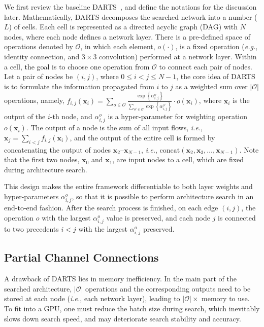 \documentclass{article} \usepackage{iclr2020_conference,times}
\begin{document}
We first review the baseline DARTS~\citep{liu2018darts}, and define the notations for the discussion later. Mathematically, DARTS decomposes the searched network into a number ($L$) of cells. Each cell is represented as a directed acyclic graph (DAG) with $N$ nodes, where each node defines a network layer. There is a pre-defined space of operations denoted by $\mathcal{O}$, in which each element, $o\!\left(\cdot\right)$, is a fixed operation (\textit{e.g.}, identity connection, and $3\times3$ convolution) performed at a network layer. Within a cell, the goal is to choose one operation from $\mathcal{O}$ to connect each pair of nodes. Let a pair of nodes be $\left(i,j\right)$, where ${0}\leqslant{i}<{j}\leqslant{N-1}$, the core idea of DARTS is to formulate the information propagated from $i$ to $j$ as a weighted sum over $\left|\mathcal{O}\right|$ operations, namely, ${f_{i,j}\!\left(\mathbf{x}_i\right)}={{\sum_{o\in\mathcal{O}}}\frac{\exp\left\{\alpha_{i,j}^o\right\}}{{\sum_{o'\in\mathcal{O}}}\exp\left\{\alpha_{i,j}^{o'}\right\}}\cdot o\!\left(\mathbf{x}_i\right)}$, where $\mathbf{x}_i$ is the output of the $i$-th node, and $\alpha_{i,j}^o$ is a hyper-parameter for weighting operation $o\!\left(\mathbf{x}_i\right)$. The output of a node is the sum of all input flows, \textit{i.e.}, ${\mathbf{x}_j}={{\sum_{i<j}}f_{i,j}\!\left(\mathbf{x}_i\right)}$, and the output of the entire cell is formed by concatenating the output of nodes $\mathbf{x}_2$--$\mathbf{x}_{N-1}$, \textit{i.e.}, $\mathrm{concat}\!\left(\mathbf{x}_2,\mathbf{x}_3,\ldots,\mathbf{x}_{N-1}\right)$. Note that the first two nodes, $\mathbf{x}_0$ and $\mathbf{x}_1$, are input nodes to a cell, which are fixed during architecture search.

This design makes the entire framework differentiable to both layer weights and hyper-parameters $\alpha_{i,j}^o$, so that it is possible to perform architecture search in an end-to-end fashion. After the search process is finished, on each edge $\left(i,j\right)$, the operation $o$ with the largest $\alpha_{i,j}^o$ value is preserved, and each node $j$ is connected to two precedents ${i}<{j}$ with the largest $\alpha_{i,j}^o$ preserved.


\subsection{Partial Channel Connections}

A drawback of DARTS lies in memory inefficiency. In the main part of the searched architecture, $|\mathcal{O}|$ operations and the corresponding outputs need to be stored at each node (\textit{i.e.}, each network layer), leading to $|\mathcal{O}|\times$ memory to use. To fit into a GPU, one must reduce the batch size during search, which inevitably slows down search speed, and may deteriorate search stability and accuracy.
\end{document}
